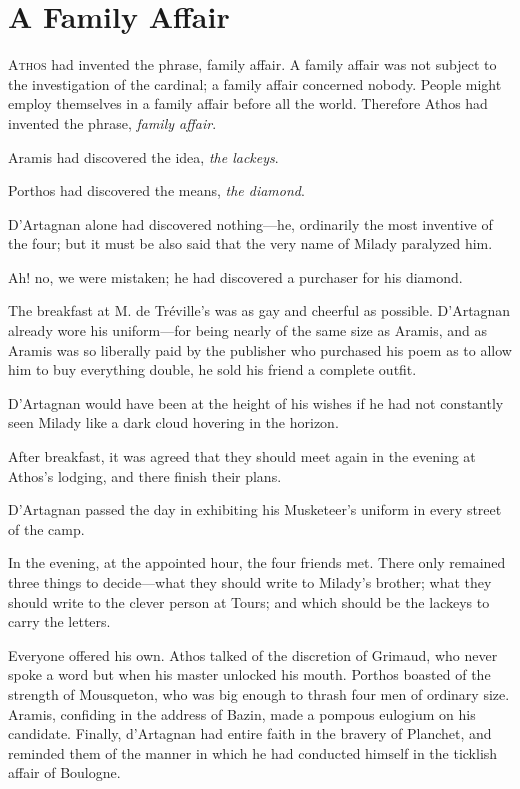 
\chapter{A Family Affair}

\lettrine[]{A}{thos} had invented the phrase, family affair. A family affair was not subject to the investigation of the cardinal; a family affair concerned nobody. People might employ themselves in a family affair before all the world. Therefore Athos had invented the phrase, \textit{family affair}. 

Aramis had discovered the idea, \textit{the lackeys}. 

Porthos had discovered the means, \textit{the diamond}. 

D'Artagnan alone had discovered nothing---he, ordinarily the most inventive of the four; but it must be also said that the very name of Milady paralyzed him. 

Ah! no, we were mistaken; he had discovered a purchaser for his diamond. 

The breakfast at M. de Tréville's was as gay and cheerful as possible. D'Artagnan already wore his uniform---for being nearly of the same size as Aramis, and as Aramis was so liberally paid by the publisher who purchased his poem as to allow him to buy everything double, he sold his friend a complete outfit. 

D'Artagnan would have been at the height of his wishes if he had not constantly seen Milady like a dark cloud hovering in the horizon. 

After breakfast, it was agreed that they should meet again in the evening at Athos's lodging, and there finish their plans. 

D'Artagnan passed the day in exhibiting his Musketeer's uniform in every street of the camp. 

In the evening, at the appointed hour, the four friends met. There only remained three things to decide---what they should write to Milady's brother; what they should write to the clever person at Tours; and which should be the lackeys to carry the letters. 

Everyone offered his own. Athos talked of the discretion of Grimaud, who never spoke a word but when his master unlocked his mouth. Porthos boasted of the strength of Mousqueton, who was big enough to thrash four men of ordinary size. Aramis, confiding in the address of Bazin, made a pompous eulogium on his candidate. Finally, d'Artagnan had entire faith in the bravery of Planchet, and reminded them of the manner in which he had conducted himself in the ticklish affair of Boulogne. 

